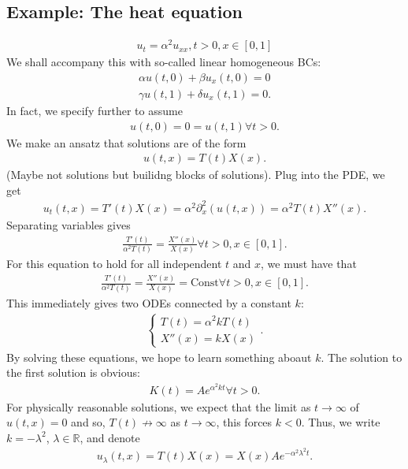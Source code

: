 \documentclass{article}
\theoremstyle{definition}
\newcommand{\p}{\partial}
\newcommand{\R}{\mathbb{R}}
\begin{document}
\subsection{Example: The heat equation}
\begin{align*}
u_t = \alpha^2 u_{xx}, t>0, x\in[0,1]
\end{align*}
We shall accompany this with so-called linear homogeneous BCs:
\begin{align*}
\alpha u(t,0) + \beta u_x(t,0) = 0\\
\gamma u(t,1) + \delta u_x(t,1) = 0.
\end{align*}
In fact, we specify further to assume
\begin{align*}
u(t,0)=0=u(t,1)\forall t > 0.
\end{align*}
We make an ansatz that solutions are of the form
\begin{align*}
u(t,x) = T(t)X(x).
\end{align*}
(Maybe not solutions but builidng blocks of solutions). Plug into the PDE, we get
\begin{align*}
u_t(t,x) = T'(t)X(x) = \alpha^2\p_x^2(u(t,x)) = \alpha^2 T(t)X''(x). 
\end{align*}
Separating variables gives
\begin{align*}
\frac{T'(t)}{\alpha^2 T(t)} = \frac{X''(x)}{X(x)} \forall t>0, x\in[0,1].
\end{align*} 
For this equation to hold for all independent $t$ and $x$, we must have that 
\begin{align*}
\frac{T'(t)}{\alpha^2 T(t)} = \frac{X''(x)}{X(x)} = \text{Const} \forall t>0, x\in[0,1].
\end{align*}
This immediately gives two ODEs connected by a constant $k$:
\begin{align*}
\begin{cases}
T(t) = \alpha^2 k T(t)\\
X''(x) = kX(x)
\end{cases}.
\end{align*}
By solving these equations, we hope to learn something aboaut $k$. The solution to the first solution is obvious:
\begin{align*}
K(t) = Ae^{\alpha^2 kt} \forall t > 0. 
\end{align*}
For physically reasonable solutions, we expect that the limit as $t\to \infty$ of $u(t,x) = 0$ and so, $T(t)\not\to\infty$ as $t\to\infty$, this forces $k<0$. Thus, we write $k=-\lambda^2$, $\lambda\in\R$, and denote
\begin{align*}
u_\lambda(t,x) = T(t)X(x) = X(x)Ae^{-\alpha^2\lambda^2t}.
\end{align*}
\end{document}
